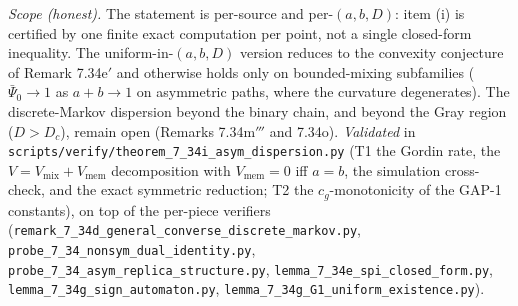 \documentclass[
]{article}
\begin{document}
\emph{Scope (honest).} The statement is per-source and per-$(a,b,D)$: item (i)
is certified by one finite exact computation per point, not a single
closed-form inequality. The uniform-in-$(a,b,D)$ version reduces to the
convexity conjecture of Remark 7.34e$'$ and otherwise holds only on
bounded-mixing subfamilies ($\bar\Psi_0\to1$ as $a+b\to1$ on asymmetric paths,
where the curvature degenerates). The discrete-Markov dispersion beyond the
binary chain, and beyond the Gray region ($D>D_c$), remain open (Remarks
7.34m$'''$ and 7.34o).
\emph{Validated} in
\texttt{scripts/verify/theorem\_7\_34i\_asym\_dispersion.py} (T1 the Gordin
rate, the $V=V_{\mathrm{mix}}+V_{\mathrm{mem}}$ decomposition with
$V_{\mathrm{mem}}=0$ iff $a=b$, the simulation cross-check, and the exact
symmetric reduction; T2 the $c_g$-monotonicity of the GAP-1 constants), on top
of the per-piece verifiers
(\texttt{remark\_7\_34d\_general\_converse\_discrete\_markov.py},
\texttt{probe\_7\_34\_nonsym\_dual\_identity.py},
\texttt{probe\_7\_34\_asym\_replica\_structure.py},
\texttt{lemma\_7\_34e\_spi\_closed\_form.py},
\texttt{lemma\_7\_34g\_sign\_automaton.py},
\texttt{lemma\_7\_34g\_G1\_uniform\_existence.py}).
\end{document}
